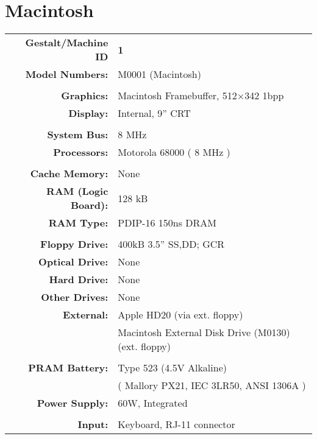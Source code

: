 
\section{Macintosh}
\sectionrule

\begin{tabular}{ r p{6in} }
\textbf{Gestalt/Machine ID} & \textbf{1} \\
\textbf{Model Numbers:} & M0001 (Macintosh) \\
\\
\textbf{Graphics:} & Macintosh Framebuffer, 512\(\times\)342 1bpp \\
\textbf{Display:} & Internal, 9'' CRT \\
\\
\textbf{System Bus:} & 8 MHz \\
\textbf{Processors:} & Motorola 68000 ( 8 MHz ) \\
\\
\textbf{Cache Memory:} & None \\
\textbf{RAM (Logic Board):} & 128 kB \\
\textbf{RAM Type:} & PDIP-16 150ns DRAM \\
\\
\textbf{Floppy Drive:} & 400kB 3.5'' SS,DD; GCR \\
\textbf{Optical Drive:} & None \\
\textbf{Hard Drive:} & None \\
\textbf{Other Drives:} & None \\
\textbf{External:} & Apple HD20 (via ext. floppy) \\
~ & Macintosh External Disk Drive (M0130) (ext. floppy) \\
\\
\textbf{PRAM Battery:} & Type 523 (4.5V Alkaline) \\
~ & ( Mallory PX21, IEC 3LR50, ANSI 1306A )\\
\textbf{Power Supply:} & 60W, Integrated \\
\\
\textbf{Input:} & Keyboard, RJ-11 connector \\

\end{tabular}
